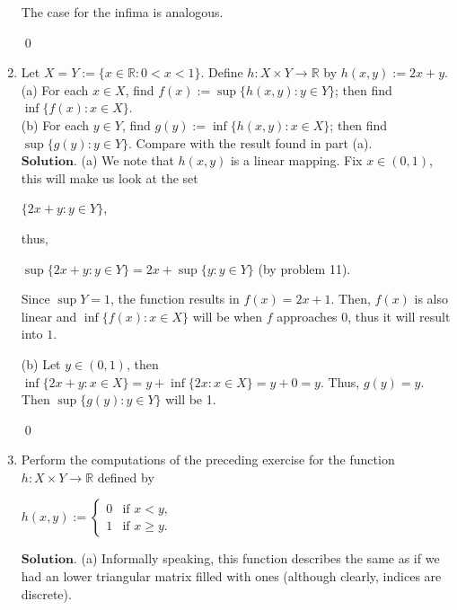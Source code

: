 \documentclass{article}
\theoremstyle{remark}
\begin{document}
\begin{enumerate}
            The case for the infima is analogous.
            \begin{flushright}
                \qed
            \end{flushright}
            \item Let $X = Y := \{x \in \mathbb{R}: 0 < x < 1\}$. Define $h: X\times Y \to \mathbb{R}$ by $h(x,y) := 2x+y$.\\
            (a) For each $x \in X$, find $f(x) := \sup \{h(x,y): y\in Y\}$; then find $\inf \{f(x): x \in X\}$.\\
            (b) For each $y \in Y$, find $g(y) := \inf \{h(x,y): x \in X\}$; then find $\sup \{g(y): y \in Y\}$. Compare with the result found in part (a).\\
            $\textbf{Solution.}$
            (a) We note that $h(x,y)$ is a linear mapping. Fix $x \in (0,1)$, this will make us look at the set 
            \begin{center}
                $\displaystyle \{2x + y: y \in Y\}$,
            \end{center}
            thus,
            \begin{center}
                $\displaystyle \sup\{2x + y: y \in Y\} = 2x + \sup \{y: y\in Y\}$ (by problem 11).
            \end{center}
            Since $\sup Y = 1$, the function results in $f(x) = 2x + 1$.
            Then, $f(x)$ is also linear and $\inf \{f(x): x \in X\}$ will be when $f$ approaches $0$, thus it will result into $1$.

            (b) Let $y \in (0,1)$, then $\inf \{2x + y: x \in X\} = y + \inf \{2x : x\in X\} = y + 0 = y$.
            Thus, $g(y) = y$.
            Then $\sup \{g(y) : y \in Y\}$ will be 1.
            \begin{flushright}
                \qed
            \end{flushright}

            \item Perform the computations of the preceding exercise for the function $h: X\times Y \to \mathbb{R}$
            defined by 
            \begin{center}
                $ h(x,y) :=
                \begin{cases}
                    0 & \text{if } x<y, \\
                    1 & \text{if } x \geq y.
                \end{cases}
                $
            \end{center}
            $\textbf{Solution.}$
            (a) Informally speaking, this function describes the same as if we had an lower triangular matrix filled with ones (although clearly, indices are discrete).
            

\end{enumerate}
\end{document}

